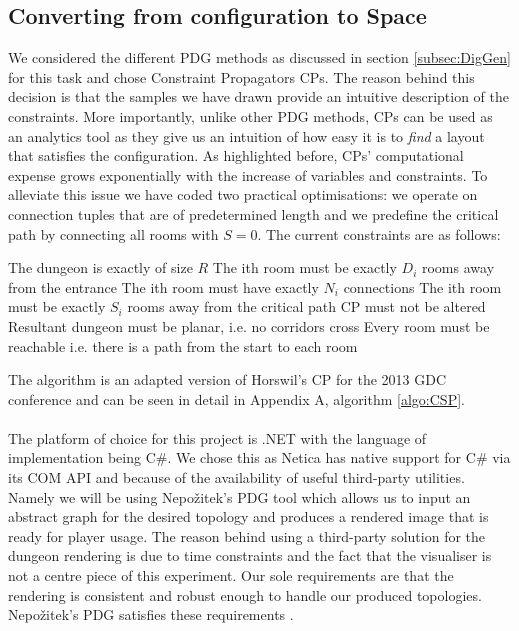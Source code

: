 \documentclass{UoYCSproject}
\begin{document}
\subsection{Converting from configuration to Space}
\label{subsec:CSP}
 We considered the different PDG methods as discussed in section \ref{subsec:DigGen} for this task and chose Constraint Propagators CPs. The reason behind this decision is that the samples we have drawn provide an intuitive description of the constraints. More importantly, unlike other PDG methods, CPs can be used as an analytics tool as they give us an intuition of how easy it is to \textit{find} a layout that satisfies the configuration. As highlighted before, CPs' computational expense grows exponentially with the increase of variables and constraints. To alleviate this issue we have coded two practical optimisations: we operate on connection tuples that are of predetermined length and we predefine the critical path by connecting all rooms with \(S = 0\). The current constraints are as follows:
\begin{outline}[enumerate]
  \1 The dungeon is exactly of size \(R\)
  \1 The ith room must be exactly \(D_i\) rooms away from the entrance
  \1 The ith room must have exactly \(N_i\) connections 
  \1 The ith room must be exactly \(S_i\) rooms away from the critical path
  \1 CP must not be altered
  \1 Resultant dungeon must be planar, i.e. no corridors cross
  \1 Every room must be reachable i.e. there is a path from the start to each room
\end{outline}

The algorithm is an adapted version of Horswil's CP for the 2013 GDC conference \parencite{HorswillCPInAWeekend} and can be seen in detail in Appendix A, algorithm \ref{algo:CSP}.

\paragraph{}
The platform of choice for this project is .NET with the language of implementation being C\#. We chose this as Netica has native support for C\# via its COM API and because of the availability of useful third-party utilities. Namely we will be using Nepo\v{z}itek's PDG tool \parencite{levelGenerator} which allows us to input an abstract graph for the desired topology and produces a rendered image that is ready for player usage. The reason behind using a third-party solution for the dungeon rendering is due to time constraints and the fact that the visualiser is not a centre piece of this experiment. Our sole requirements are that the rendering is consistent and robust enough to handle our produced topologies. Nepo\v{z}itek's PDG satisfies these requirements \parencite{Nepozitek2018FASTCT}.
\end{document}
